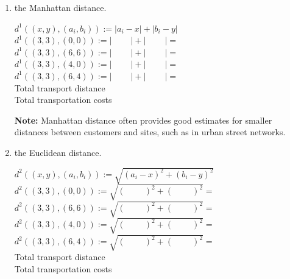 \begin{enumerate}
	\item the Manhattan distance.
	
	\begin{solution}
	$d^1\left(\left(x,y\right),\left(a_i,b_i\right)\right):=\left|a_i-x\right|+\left|b_i-y\right|$\\
	$d^1\left(\left(3,3\right),\left(0,0\right)\right):=\left|\phantom{0-3}\right|+\left|\phantom{0-3}\right|=\phantom{6}$\\
	$d^1\left(\left(3,3\right),\left(6,6\right)\right):=\left|\phantom{6-3}\right|+\left|\phantom{6-3}\right|=\phantom{6}$\\
	$d^1\left(\left(3,3\right),\left(4,0\right)\right):=\left|\phantom{4-3}\right|+\left|\phantom{0-3}\right|=\phantom{4}$\\
	$d^1\left(\left(3,3\right),\left(6,4\right)\right):=\left|\phantom{6-3}\right|+\left|\phantom{4-3}\right|=\phantom{4}$\\
	
	Total transport distance \phantom{ $=2\cdot4\cdot6+2\cdot4\cdot6+2\cdot2\cdot4+2\cdot2\cdot4=128$}\\
	Total transportation costs \phantom{$=128\cdot0.5=64$}
	
	\textbf{Note:} Manhattan distance often provides good estimates for smaller distances between customers and sites, such as in urban street networks.
	\end{solution}
	
	\item the Euclidean distance.
	
	\begin{solution}
	$d^2\left(\left(x,y\right),\left(a_i,b_i\right)\right):=\sqrt{\left(a_i-x\right)^2+\left(b_i-y\right)^2}$\\
	$d^2\left(\left(3,3\right),\left(0,0\right)\right):=\sqrt{\left(\phantom{0-3}\right)^2+\left(\phantom{0-3}\right)^2}=\phantom{3\sqrt{2}}$\\
	$d^2\left(\left(3,3\right),\left(6,6\right)\right):=\sqrt{\left(\phantom{6-3}\right)^2+\left(\phantom{6-3}\right)^2}=\phantom{3\sqrt{2}}$\\
	$d^2\left(\left(3,3\right),\left(4,0\right)\right):=\sqrt{\left(\phantom{4-3}\right)^2+\left(\phantom{0-3}\right)^2}=\phantom{\sqrt{10}}$\\
	$d^2\left(\left(3,3\right),\left(6,4\right)\right):=\sqrt{\left(\phantom{6-3}\right)^2+\left(\phantom{4-3}\right)^2}=\phantom{\sqrt{10}}$\\	
	Total transport distance \\
	Total transportation costs \phantom{$=93.18\cdot0.5=46.59$}
	

\end{solution}
\end{enumerate}
